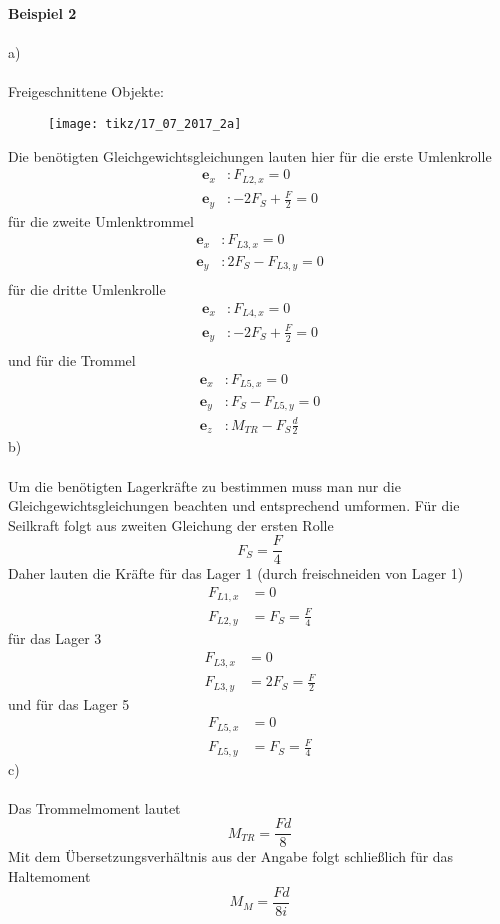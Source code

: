\newpage
\noindent
\textbf{Beispiel 2}\\ \\
a)\\ \\
Freigeschnittene Objekte:
\begin{figure}[h]
	\centering
	\texttt{[image: tikz/17\_07\_2017\_2a]}
\end{figure}
\newline
Die benötigten Gleichgewichtsgleichungen lauten hier für die erste Umlenkrolle
\begin{align*}
	\textbf{e}_x &: F_{L2,x} = 0 \\
	\textbf{e}_y &: -2F_S + \frac{F}{2} = 0 
\end{align*}
für die zweite Umlenktrommel
\begin{align*}
	\textbf{e}_x &: F_{L3,x} = 0 \\
	\textbf{e}_y &: 2F_S - F_{L3,y} = 0 \\
\end{align*}
für die dritte Umlenkrolle
\begin{align*}
	\textbf{e}_x &: F_{L4,x} = 0\\
	\textbf{e}_y &: -2F_S + \frac{F}{2} = 0 \\
\end{align*}
und für die Trommel
\begin{align*}
	\textbf{e}_x &: F_{L5,x} = 0\\
	\textbf{e}_y &: F_S - F_{L5,y} = 0\\
	\textbf{e}_z &: M_{TR} - F_S\frac{d}{2}
\end{align*}
\newpage
\noindent
b)\\ \\
Um die benötigten Lagerkräfte zu bestimmen muss man nur die Gleichgewichtsgleichungen beachten und entsprechend umformen. Für die Seilkraft folgt aus zweiten Gleichung der ersten Rolle
\[
	F_S = \frac{F}{4}
\]
Daher lauten die Kräfte für das Lager 1 (durch freischneiden von Lager 1)
\begin{align*}
	F_{L1,x} &= 0 \\
	F_{L2,y} &= F_S = \frac{F}{4}
\end{align*}
für das Lager 3
\begin{align*}
	F_{L3,x} &= 0 \\
	F_{L3,y} &= 2F_S = \frac{F}{2}
\end{align*}
und für das Lager 5
\begin{align*}
	F_{L5,x} &= 0 \\ 
	F_{L5,y} &= F_S = \frac{F}{4}
\end{align*}
c)\\ \\
Das Trommelmoment lautet
\[
	M_{TR} = \frac{Fd}{8}
\]
Mit dem Übersetzungsverhältnis aus der Angabe folgt schließlich für das Haltemoment
\[
	M_M = \frac{Fd}{8i}
\]